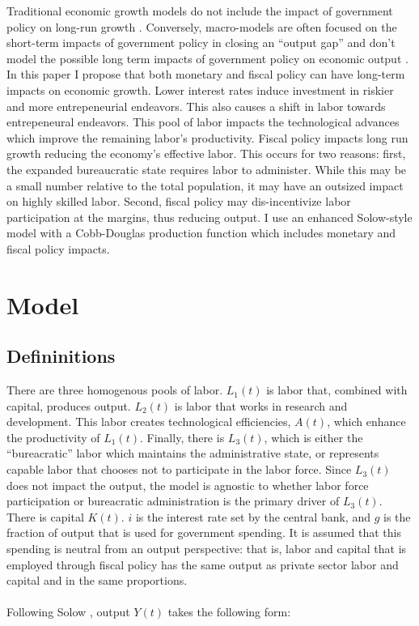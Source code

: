 \documentclass[12pt]{article}
\theoremstyle{definition}
\begin{document}
Traditional economic growth models do not include the impact of government policy on long-run growth \cite{solow}. Conversely, macro-models are often focused on the short-term impacts of government policy in closing an ``output gap'' and don't model the possible long term impacts of government policy on economic output \cite{mankiwreis}.  In this paper I propose that both monetary and fiscal policy can have long-term impacts on economic growth.  Lower interest rates induce investment in riskier and more entrepeneurial endeavors.  This also causes a shift in labor towards entrepeneural endeavors.  This pool of labor impacts the technological advances which improve the remaining labor's productivity.  Fiscal policy impacts long run growth reducing the economy's effective labor.  This occurs for two reasons: first, the expanded bureaucratic state requires labor to administer.  While this may be a small number relative to the total population, it may have an outsized impact on highly skilled labor.  Second, fiscal policy may dis-incentivize labor participation at the margins, thus reducing output.  I use an enhanced Solow-style model with a Cobb-Douglas production function which includes monetary and fiscal policy impacts.

\section{Model}

\subsection{Defininitions}
There are three homogenous pools of labor.  \(L_1(t)\) is labor that, combined with capital, produces output.  \(L_2(t)\) is labor that works in research and development.  This labor creates technological efficiencies, \(A(t)\), which enhance the productivity of \(L_1(t)\).  Finally, there is \(L_3(t)\), which is either the ``bureacratic'' labor which maintains the administrative state, or represents capable labor that chooses not to participate in the labor force.  Since \(L_3(t)\) does not impact the output, the model is agnostic to whether labor force participation or bureacratic administration is the primary driver of \(L_3(t)\).  There is capital \(K(t)\).  \(i\) is the interest rate set by the central bank, and \(g\) is the fraction of output that is used for government spending.  It is assumed that this spending is neutral from an output perspective: that is, labor and capital that is employed through fiscal policy has the same output as private sector labor and capital and in the same proportions.
\\
\\
Following Solow \cite{solow}, output \(Y(t)\) takes the following form:
\end{document}
